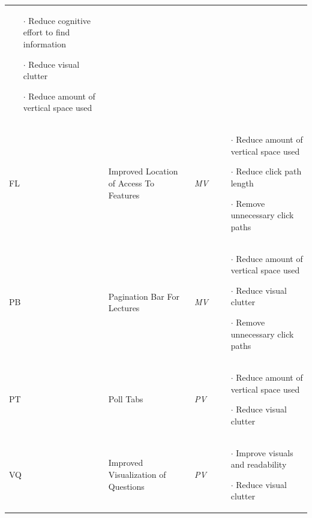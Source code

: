 \begin{small}
\begin{longtable}{ p{0.7cm} p{3.8cm} p{1cm} p{7.6cm}}
\begin{itemize}[leftmargin=*, noitemsep, topsep=0pt]
			\item[$\cdot$] Reduce cognitive effort to find information
			\item[$\cdot$] Reduce visual clutter
			\item[$\cdot$] Reduce amount of vertical space used
		\end{itemize} \vspace{-0.45cm} \\ 
		FL & Improved Location of Access To Features &\emph{MV} &
		\vspace{-0.45cm}	
		\begin{itemize}[leftmargin=*, noitemsep, topsep=0pt]
			\item[$\cdot$] Reduce amount of vertical space used
			\item[$\cdot$] Reduce click path length
			\item[$\cdot$] Remove unnecessary click paths
		\end{itemize} \vspace{-0.45cm} \\ 
		PB & Pagination Bar For Lectures &\emph{MV} & 
		\vspace{-0.45cm}	
		\begin{itemize}[leftmargin=*, noitemsep, topsep=0pt]
			\item[$\cdot$] Reduce amount of vertical space used
			\item[$\cdot$] Reduce visual clutter
			\item[$\cdot$] Remove unnecessary click paths
		\end{itemize} \vspace{-0.45cm} \\ 
		PT & Poll Tabs & \emph{PV} &
		\vspace{-0.45cm}	
		\begin{itemize}[leftmargin=*, noitemsep, topsep=0pt]
			\item[$\cdot$] Reduce amount of vertical space used
			\item[$\cdot$] Reduce visual clutter
		\end{itemize} \vspace{-0.45cm} \\ 
		VQ & Improved Visualization of Questions & \emph{PV} &
		\vspace{-0.45cm}	
		\begin{itemize}[leftmargin=*, noitemsep, topsep=0pt]
			\item[$\cdot$] Improve visuals and readability
			\item[$\cdot$] Reduce visual clutter
		\end{itemize} \vspace{-0.45cm} \\ 

\end{longtable}
\end{small}
